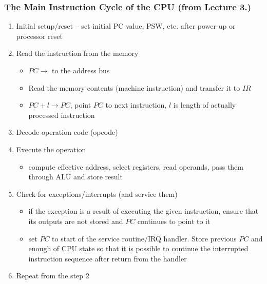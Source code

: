 \documentclass{beamer}
\begin{document}
\begin{frame}
\frametitle{The Main Instruction Cycle of the CPU (from Lecture 3.)}
\begin{enumerate}
  \item Initial setup/reset -- set initial PC value, PSW, etc. after power-up or processor reset
  \item Read the instruction from the memory
  \begin{itemize}
    \item $PC \to$ to the address bus
    \item Read the memory contents (machine instruction) and transfer it to $IR$
    \item $PC+l \to PC$, point $PC$ to next instruction, $l$ is length of actually processed instruction
  \end{itemize}
  \item Decode operation code (opcode)
  \item Execute the operation
  \begin{itemize}
    \item compute effective address, select registers, read operands, pass them through ALU and store result
  \end{itemize}
  \item Check for exceptions/interrupts (and service them)
  \begin{itemize}
    \item if the exception is a result of executing the given instruction, ensure that its outputs are not stored and $PC$ continues to point to it
    \item set $PC$ to start of the service routine/IRQ handler. Store previous $PC$ and enough of CPU state so that it is possible to continue the interrupted instruction sequence after return from the handler 
  \end{itemize}
  \item Repeat from the step 2
\end{enumerate}
\end{frame}
\end{document}

